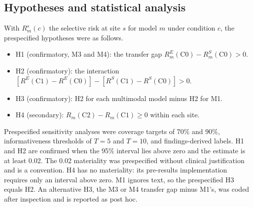 \subsection*{Hypotheses and statistical analysis}
With $R^{s}_{m}(c)$ the selective risk at site $s$ for model $m$ under
condition $c$, the prespecified hypotheses were as follows.
\begin{itemize}
  \item H1 (confirmatory, M3 and M4): the transfer gap
        $R^{E}_{m}(\mathrm{C0})-R^{S}_{m}(\mathrm{C0})>0$.
  \item H2 (confirmatory): the interaction
        $[R^{E}(\mathrm{C1})-R^{E}(\mathrm{C0})]-[R^{S}(\mathrm{C1})-R^{S}(\mathrm{C0})]>0$.
  \item H3 (confirmatory): H2 for each multimodal model minus H2 for M1.
  \item H4 (secondary): $R_{m}(\mathrm{C2})-R_{m}(\mathrm{C1})\ge0$ within each
        site.
\end{itemize}
Prespecified sensitivity analyses were coverage targets of 70\% and 90\%,
informativeness thresholds of $T=5$ and $T=10$, and findings-derived labels.
H1 and H2 are confirmed when the 95\% interval lies above zero and the
estimate is at least 0.02. The 0.02 materiality was prespecified without clinical
justification and is a convention. H4 has no materiality: its pre-results
implementation requires only an interval above zero. M1 ignores text, so the
prespecified H3 equals H2. An alternative H3, the M3 or M4 transfer gap minus
M1's, was coded after inspection and is reported as post hoc.

